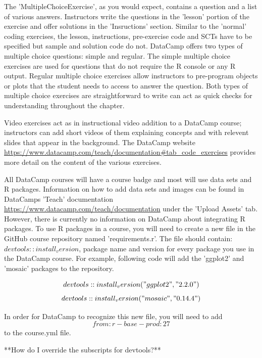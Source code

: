 \documentclass[12pt]{article}
\begin{document}




The 'MultipleChoiceExercise', as you would expect, contains a question and a list of various answers. Instructors write the questions in the 'lesson'
portion of the exercise and offer solutions in the 'Insructions' section. Similar to the 'normal' coding exercises, the lesson, instructions, pre-exercise 
code and SCTs have to be specified but sample and solution code do not. DataCamp offers two types of multiple choice questions: simple and regular. 
The simple multiple choice exercises are used for questions that do not require the R console or any R output. Regular multiple choice exercises 
allow instructors to pre-program objects or plots that the student needs to access to answer the question. Both types of multiple choice exercises 
are straightforward to write can act as quick checks for understanding throughout the chapter.


Video exercises act as in instructional video addition to a DataCamp course; instructors can add short videos of them explaining concepts and with 
relevent slides that appear in the background. The DataCamp website \url{https://www.datacamp.com/teach/documentation#tab_code_exercises} provides 
more detail on the content of the various exercises. 


All DataCamp courses will have a course badge and most will use data sets and R packages. Information on how to add data sets and images
can be found in DataCamps 'Teach' documentation \url{https://www.datacamp.com/teach/documentation} under the 'Upload Assets' tab. However,
there is currently no information on DataCamp about integrating R packages. To use R packages in a course, you will need to create a new file
in the GitHub course repository named 'requirements.r'. The file should contain: $devtools::install_version$, package name and version for every
package you use in the DataCamp course. For example, following code will add the 'ggplot2' and 'mosaic' packages to the repository.

$$devtools::install_version("ggplot2", "2.2.0")$$
$$devtools::install_version("mosaic", "0.14.4")$$

In order for DataCamp to recognize this new file, you will need to add $$from: r-base-prod:27$$ to the course.yml file.

**How do I override the subscripts for devtools?**






%


\end{document}
